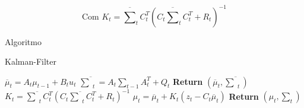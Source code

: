 \begin{equation}
    \text{Com }
    K_t = \overline{\textstyle\sum}_tC_t^T(C_t\overline{\textstyle\sum}_tC_t^T+R_t)^{-1}
\end{equation}


Algoritmo

\begin{algorithm}[H]
    \caption{Kalman-Filter}
    \begin{algorithmic}[1]
        \State $\overline{\mu}_t = A_t\mu_{t-1} + B_t u_t$
        \State $ \overline{\textstyle\sum}_t = A_t {\textstyle\sum}_{t-1} A_t^T+ Q_t$ 
        \State \textbf{Return} $\left(\overline{\mu}_t, \overline{\textstyle\sum}_t\right)$
    \EndProcedure
        \State $K_t = \overline{\textstyle\sum}_tC_t^T(C_t\overline{\textstyle\sum}_tC_t^T+R_t)^{-1}$
        \State $\mu_t  = \overline{\mu}_t + K_t(z_t -C_t\overline\mu_t)$
        \State \textbf{Return} $\left(\mu_t, \textstyle\sum_t\right)$
    \EndProcedure
    \end{algorithmic}
\end{algorithm}


        
        
